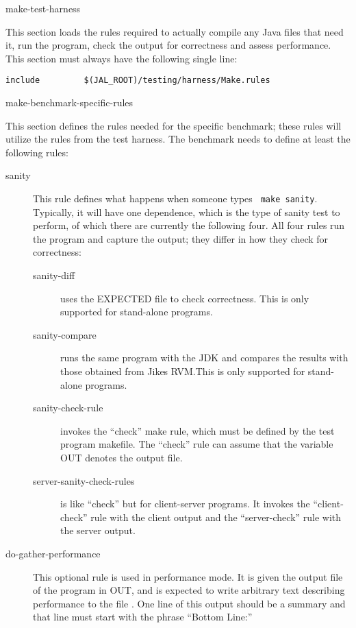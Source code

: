 \begin{description}
\begin{Label}{make-test-harness}
\item[Include the test harness makefile]
  This section loads the rules
required to actually compile any Java files that need it, run the
program, check the output for correctness and assess performance.
This section must always have the following single line:
\begin{verbatim}
include         $(JAL_ROOT)/testing/harness/Make.rules
\end{verbatim}
\end{Label}

\begin{Label}{make-benchmark-specific-rules}
\item[Define benchmark-specific rules]
  This section defines the rules
needed for the specific benchmark; these rules will utilize the rules
from the test harness.  The benchmark needs to define at least the
following rules:

\begin{description}

\item[sanity] This rule defines what happens when someone types {\tt
make sanity}.  Typically, it will have one dependence, which is the type
of sanity test to perform, of which there are currently the following
four.  All four rules run the program and capture the output; they
differ in how they check for correctness:
\begin{description}
\item[sanity-diff] uses the EXPECTED file to check correctness.  This
is only supported for stand-alone programs.
\item[sanity-compare] runs the same program with the JDK and compares
the results with those obtained from Jikes RVM.\@  This is only supported for
stand-alone programs. 
\item[sanity-check-rule] invokes the ``check'' make rule, which must be
defined by the test program makefile.  The ``check'' rule can assume
that the variable OUT denotes the output file.
\item[server-sanity-check-rules] is like ``check'' but for
client-server programs.  It invokes the ``client-check'' rule with the
client output and the ``server-check'' rule with the server output.
\end{description}

\item[do-gather-performance]  This optional rule is used in
performance mode.  It is given the output file of the program in OUT,
and is expected to write arbitrary text describing performance to the
file .  One line of this output should be a summary and that
line must start with the phrase ``Bottom Line:''


\end{description}
\end{Label}
\end{description}
